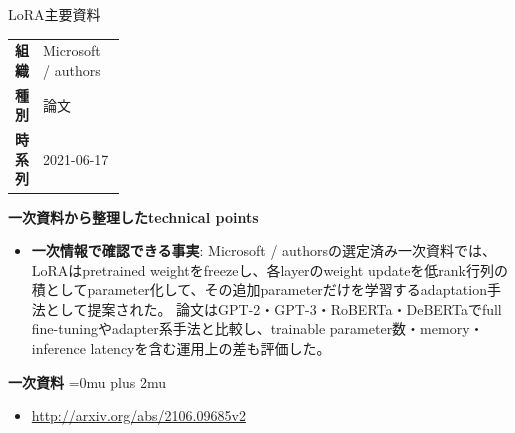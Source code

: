 \begin{technicalnote}{LoRA}{主要資料}
\begingroup
\begin{tabularx}{\linewidth}{@{}>{\bfseries}p{0.22\linewidth}X@{}}
組織 & Microsoft / authors \\
種別 & 論文 \\
時系列 & 2021-06-17 \\
\end{tabularx}
\smallskip
{\bfseries 一次資料から整理したtechnical points}
\begin{itemize}[leftmargin=1.5em,itemsep=0.35em]
\item \textbf{一次情報で確認できる事実}: Microsoft / authorsの選定済み一次資料では、LoRAはpretrained weightをfreezeし、各layerのweight updateを低rank行列の積としてparameter化して、その追加parameterだけを学習するadaptation手法として提案された。 論文はGPT-2・GPT-3・RoBERTa・DeBERTaでfull fine-tuningやadapter系手法と比較し、trainable parameter数・memory・inference latencyを含む運用上の差も評価した。
\end{itemize}
\begin{minipage}{\linewidth}
\begin{samepage}
{\bfseries 一次資料}
\begingroup\sloppy
\Urlmuskip=0mu plus 2mu\relax
\begin{itemize}[leftmargin=1.5em,itemsep=0.25em]
\item {\scriptsize\url{http://arxiv.org/abs/2106.09685v2}}
\end{itemize}
\endgroup
\end{samepage}
\end{minipage}
\endgroup
\end{technicalnote}
\medskip
